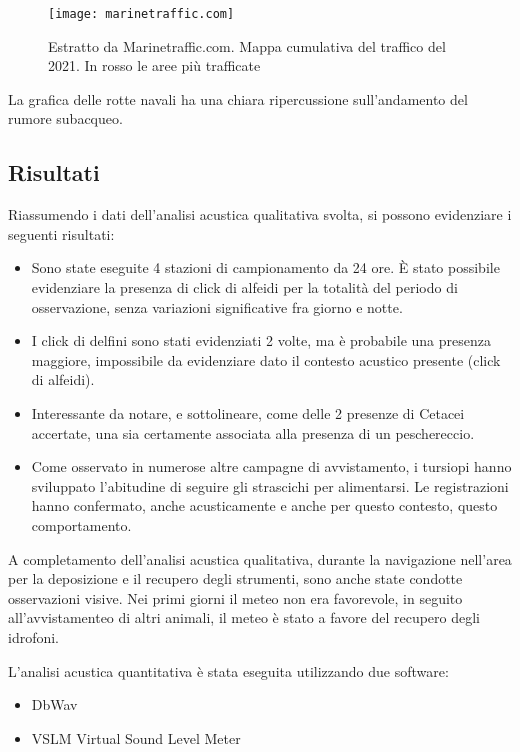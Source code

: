 \begin{figure}[h]
\centering 
\texttt{[image: marinetraffic.com]}
\caption{Estratto da Marinetraffic.com. Mappa cumulativa del traffico del 2021. In rosso le aree più trafficate}
\end{figure} 

La grafica delle rotte navali ha una chiara ripercussione sull’andamento del rumore subacqueo.

\subsection{Risultati}
 
Riassumendo i dati dell’analisi acustica qualitativa svolta, si possono evidenziare i seguenti risultati: 
\begin{itemize} 
\item Sono state eseguite 4 stazioni di campionamento da 24 ore. 
È stato possibile evidenziare la presenza di click di alfeidi per la totalità del periodo di osservazione, senza variazioni significative fra giorno e notte. 
\item I click di delfini sono stati evidenziati 2 volte, ma è probabile una presenza maggiore, impossibile da evidenziare dato il contesto acustico presente (click di alfeidi). 
\item Interessante da notare, e sottolineare, come delle 2 presenze di Cetacei accertate, una sia certamente associata alla presenza di un peschereccio. 
\item Come osservato in numerose altre campagne di avvistamento, i tursiopi hanno sviluppato l’abitudine di seguire gli strascichi per alimentarsi. 
Le registrazioni hanno confermato, anche acusticamente e anche per questo contesto, questo comportamento. 
\end{itemize} 

A completamento dell’analisi acustica qualitativa, durante la navigazione nell’area per la deposizione e il recupero degli strumenti, sono anche state condotte osservazioni visive. 
Nei primi giorni il meteo non era favorevole, in seguito all'avvistamenteo di altri animali, il meteo è stato a favore del recupero degli idrofoni. 

L'analisi acustica quantitativa è stata eseguita utilizzando due software: 
\begin{itemize}
\item DbWav %
\item VSLM Virtual Sound Level Meter %
\end{itemize} 


